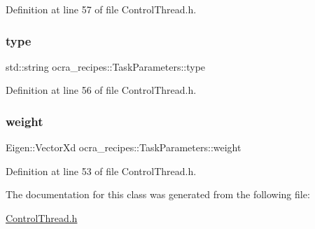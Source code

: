 Definition at line 57 of file Control\+Thread.\+h.

\hypertarget{classocra__recipes_1_1TaskParameters_a8c62a820309b362ba4ce8c515a66aff4}{}\label{classocra__recipes_1_1TaskParameters_a8c62a820309b362ba4ce8c515a66aff4} 
\subsubsection{\texorpdfstring{type}{type}}
{\footnotesize\ttfamily std\+::string ocra\+\_\+recipes\+::\+Task\+Parameters\+::type}



Definition at line 56 of file Control\+Thread.\+h.

\hypertarget{classocra__recipes_1_1TaskParameters_aa960ee789e002d17f148a67cb8b35251}{}\label{classocra__recipes_1_1TaskParameters_aa960ee789e002d17f148a67cb8b35251} 
\subsubsection{\texorpdfstring{weight}{weight}}
{\footnotesize\ttfamily Eigen\+::\+Vector\+Xd ocra\+\_\+recipes\+::\+Task\+Parameters\+::weight}



Definition at line 53 of file Control\+Thread.\+h.



The documentation for this class was generated from the following file\+:\begin{DoxyCompactItemize}
\item 
\hyperlink{ControlThread_8h}{Control\+Thread.\+h}\end{DoxyCompactItemize}
